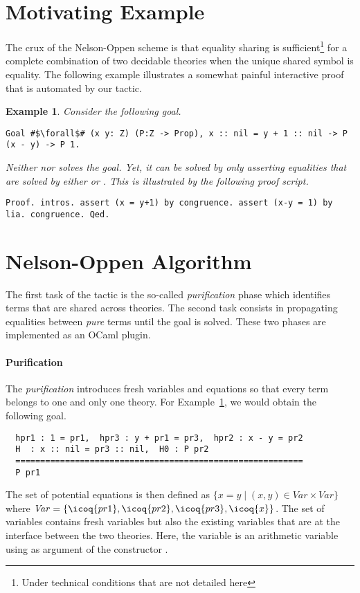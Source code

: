 \documentclass{easychair}
\newtheorem{example}{Example}
\begin{document}
\section{Motivating Example}
The crux of the Nelson-Oppen scheme is that equality sharing is
sufficient\footnote{Under technical conditions that are not detailed here} for
a complete combination of two decidable theories  when
the unique shared symbol is equality. The following example
illustrates a somewhat painful interactive proof that is automated by our
 tactic.
\begin{example}
  \label{exa:motivating}
  Consider the following goal.
\begin{verbatim}
Goal #$\forall$# (x y: Z) (P:Z -> Prop), x :: nil = y + 1 :: nil -> P (x - y) -> P 1.
\end{verbatim}
Neither  nor  solves the goal. Yet, it can
be solved by only asserting equalities that are solved by either  or .
This is illustrated by the following proof script.
\begin{verbatim}
Proof. intros. assert (x = y+1) by congruence. assert (x-y = 1) by lia. congruence. Qed.
\end{verbatim}
\end{example}

\section{Nelson-Oppen Algorithm}
The first task of the  tactic is the so-called
\emph{purification} phase which identifies terms that are shared across
theories. The second task consists in propagating equalities between
\emph{pure} terms until the goal is solved. These two phases are implemented
as an OCaml plugin.

\paragraph{Purification}
The \emph{purification} introduces fresh variables and
equations so that every term belongs to one and only one theory.
For Example~\ref{exa:motivating}, we would obtain the following goal.
\begin{verbatim}
  hpr1 : 1 = pr1,  hpr3 : y + pr1 = pr3,  hpr2 : x - y = pr2
  H  : x :: nil = pr3 :: nil,  H0 : P pr2
  ==========================================================
  P pr1
\end{verbatim}
The set of potential equations is then defined as
$
\{ x = y \mid (x,y) \in \mathit{Var} \times \mathit{Var} \}
$
where $\mathit{Var} = \{\icoq{pr1},\icoq{pr2}, \icoq{pr3}, \icoq{x} \}$.
%
The set of variables contains fresh variables but also the existing
variables that are at the interface between the two theories.  Here,
the variable  is an arithmetic variable using as argument of
the constructor \icoq{::}.
\end{document}
